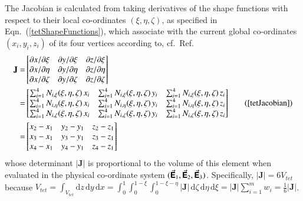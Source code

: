 The Jacobian is calculated from taking derivatives of the shape functions with respect to their local co-ordinates $(\xi, \eta, \zeta)$, as specified in Eqn.~(\ref{tetShapeFunctions}), which associate with the current global co-ordinates $(x_i, y_i, z_i)$ of its four vertices according to, cf.\ Ref.~\cite[pg.~424]{Reddy93}
\begin{equation}
\begin{aligned}
\mathbf{J}= &
\begin{bmatrix}
\partial x / \partial\xi & \partial y / \partial\xi & \partial z / \partial\xi\\
\partial x / \partial\eta & \partial y / \partial\eta & \partial z / \partial\eta \\
\partial x / \partial\zeta & \partial y / \partial\zeta & \partial z / \partial\zeta 
\end{bmatrix} \\
= & \begin{bmatrix}
\sum\nolimits_{i=1}^4 N_{i,\xi} (\xi,\eta,\zeta) \, x_i & \sum\nolimits_{i=1}^4 N_{i,\xi} (\xi,\eta,\zeta) \, y_i &
\sum\nolimits_{i=1}^4 N_{i,\xi} (\xi,\eta,\zeta) \, z_i\\
\sum\nolimits_{i=1}^4 N_{i,\eta} (\xi,\eta,\zeta) \, x_i & \sum\nolimits_{i=1}^4 N_{i,\eta} (\xi,\eta,\zeta) \, y_i &
\sum\nolimits_{i=1}^4 N_{i,\eta} (\xi,\eta,\zeta) \, z_i\\
\sum\nolimits_{i=1}^4 N_{i,\zeta} (\xi,\eta,\zeta) \, x_i & \sum\nolimits_{i=1}^4 N_{i,\zeta} (\xi,\eta,\zeta) \, y_i &
\sum\nolimits_{i=1}^4 N_{i,\zeta} (\xi,\eta,\zeta) \, z_i
\end{bmatrix} \\
= & \begin{bmatrix}
x_2 - x_1 & y_2 - y_1 & z_2 - z_1 \\
x_3 - x_1 & y_3 - y_1 & z_3 - z_1 \\
x_4 - x_1 & y_4 - y_1 & z_4 - z_1
\end{bmatrix}
\end{aligned}
\tag{\ref{tetJacobian}}
\end{equation}
whose determinant $| \mathbf{J} |$ is proportional to the volume of this element when evaluated in the physical co-ordinate system $( \vec{\boldsymbol{\mathsf{E}}}_1 , \vec{\boldsymbol{\mathsf{E}}}_2 , \vec{\boldsymbol{\mathsf{E}}}_3 )$.  Specifically, $| \mathbf{J} | = 6V_{tet}$ because $V_{tet} = \int_{V_{tet}} \mathrm{d} z \, \mathrm{d} y \, \mathrm{d} x = \int_0^1 \int_0^{1-\xi} \int_0^{1-\xi-\eta} | \mathbf{J} | \, \mathrm{d} \zeta \, \mathrm{d} \eta \, \mathrm{d} \xi = | \mathbf{J} | \sum_{i=1}^m w_i = \tfrac{1}{6} | \mathbf{J} |$.  

